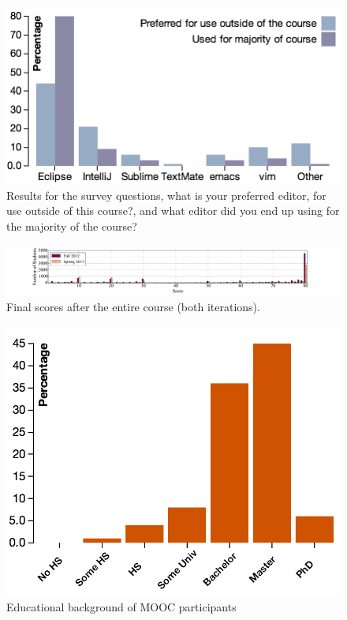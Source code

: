\documentclass{sig-alternate}
\begin{document}
\begin{figure}[ht!]
  \centering
  \includegraphics[width=\columnwidth]{plots/ides.png}
  \caption{Results for the survey questions, what is your preferred editor, for use outside of this course?, and what editor did you end up using for the majority of the course?}
  \label{fig:ides}
\end{figure}

\begin{figure}[htb!]
  \centering
  \includegraphics[width=\textwidth]{plots/final-scores.pdf}
  \vspace{-0.8cm}
  \caption{Final scores after the entire course (both iterations).}
  \label{fig:final-scores}
\end{figure}

\begin{figure}[ht!]
  \centering
  \includegraphics[width=0.85\columnwidth]{plots/education.png}
  \vspace{-0.5cm}
  \caption{Educational background of MOOC participants}
  \label{fig:education}
\end{figure}
\end{document}
